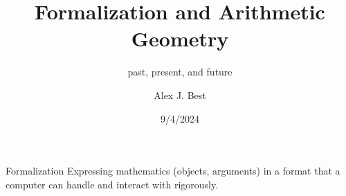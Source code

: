 \documentclass{beamer}
\author{Alex J. Best}
\date{9/4/2024}
\title{Formalization and Arithmetic Geometry}
\subtitle{past, present, and future}
\theoremstyle{plain}
\begin{document}
\begin{frame}
  \titlepage

\end{frame}


\begin{frame}{Formalization}
    Expressing mathematics (objects, arguments) in a format that a computer can handle and interact with rigorously.


\end{frame}
\end{document}
